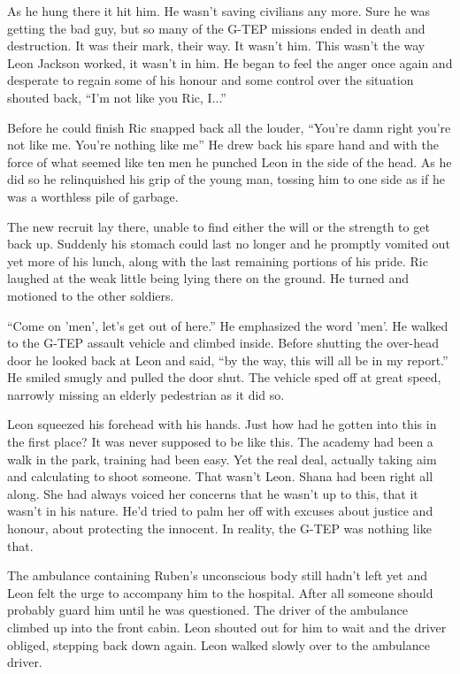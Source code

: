 As he hung there it hit him.  He wasn't saving civilians any more.  Sure he was getting the bad guy, but so many of the G-TEP missions ended in death and destruction.  It was their mark, their way.  It wasn't him.  This wasn't the way Leon Jackson worked, it wasn't in him.  He began to feel the anger once again and desperate to regain some of his honour and some control over the situation shouted back, ``I'm not like you Ric, I...'' 

Before he could finish Ric snapped back all the louder, ``You're damn right you're not like me.  You're nothing like me'' He drew back his spare hand and with the force of what seemed like ten men he punched Leon in the side of the head.  As he did so he relinquished his grip of the young man, tossing him to one side as if he was a worthless pile of garbage.  

The new recruit lay there, unable to find either the will or the strength to get back up.  Suddenly his stomach could last no longer and he promptly vomited out yet more of his lunch, along with the last remaining portions of his pride.  Ric laughed at the weak little being lying there on the ground.  He turned and motioned to the other soldiers.  

``Come on 'men', let's get out of here.''  He emphasized the word 'men'.  He walked to the G-TEP assault vehicle and climbed inside.  Before shutting the over-head door he looked back at Leon and said, ``by the way, this will all be in my report.''  He smiled smugly and pulled the door shut.  The vehicle sped off at great speed, narrowly missing an elderly pedestrian as it did so.

Leon squeezed his forehead with his hands.  Just how had he gotten into this in the first place?  It was never supposed to be like this.  The academy had been a walk in the park, training had been easy.  Yet the real deal, actually taking aim and calculating to shoot someone.  That wasn't Leon.  Shana had been right all along.  She had always voiced her concerns that he wasn't up to this, that it wasn't in his nature.  He'd tried to palm her off with excuses about justice and honour, about protecting the innocent.  In reality, the G-TEP was nothing like that.  

The ambulance containing Ruben's unconscious body still hadn't left yet and Leon felt the urge to accompany him to the hospital.  After all someone should probably guard him until he was questioned.  The driver of the ambulance climbed up into the front cabin.  Leon shouted out for him to wait and the driver obliged, stepping back down again.  Leon walked slowly over to the ambulance driver.  

